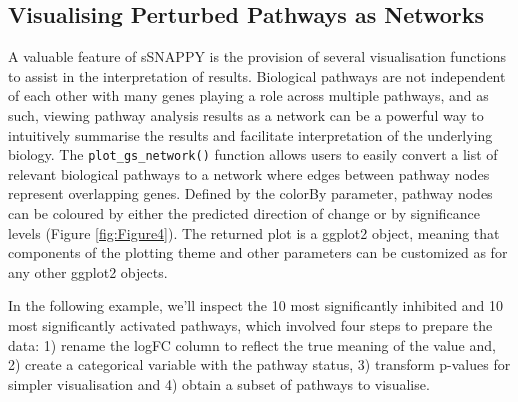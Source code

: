 \documentclass[9pt,a4paper,]{extarticle}
\begin{document}
\hypertarget{visualising-perturbed-pathways-as-networks}{%
\subsection{Visualising Perturbed Pathways as Networks}\label{visualising-perturbed-pathways-as-networks}}

A valuable feature of sSNAPPY is the provision of several visualisation functions to assist in the interpretation of results.
Biological pathways are not independent of each other with many genes playing a role across multiple pathways, and as such, viewing pathway analysis results as a network can be a powerful way to intuitively summarise the results and facilitate interpretation of the underlying biology.
The \texttt{plot\_gs\_network()} function allows users to easily convert a list of relevant biological pathways to a network where edges between pathway nodes represent overlapping genes.
Defined by the colorBy parameter, pathway nodes can be coloured by either the predicted direction of change or by significance levels (Figure \ref{fig:Figure4}).
The returned plot is a ggplot2 \citep{Wickham2009} object, meaning that components of the plotting theme and other parameters can be customized as for any other ggplot2 objects.

In the following example, we'll inspect the 10 most significantly inhibited and 10 most significantly activated pathways, which involved four steps to prepare the data: 1) rename the logFC column to reflect the true meaning of the value and, 2) create a categorical variable with the pathway status, 3) transform p-values for simpler visualisation and 4) obtain a subset of pathways to visualise.
\end{document}
